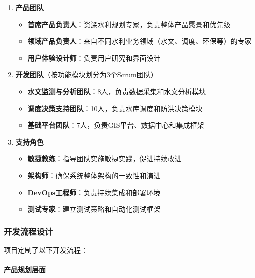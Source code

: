 \begin{enumerate}
\def\labelenumi{\arabic{enumi}.}
\tightlist
\item
  \textbf{产品团队}

  \begin{itemize}
  \tightlist
  \item
    \textbf{首席产品负责人}：资深水利规划专家，负责整体产品愿景和优先级
  \item
    \textbf{领域产品负责人}：来自不同水利业务领域（水文、调度、环保等）的专家
  \item
    \textbf{用户体验设计师}：负责用户研究和界面设计
  \end{itemize}
\item
  \textbf{开发团队}（按功能模块划分为3个Scrum团队）

  \begin{itemize}
  \tightlist
  \item
    \textbf{水文监测与分析团队}：8人，负责数据采集和水文分析模块
  \item
    \textbf{调度决策支持团队}：10人，负责水库调度和防洪决策模块
  \item
    \textbf{基础平台团队}：7人，负责GIS平台、数据中心和集成框架
  \end{itemize}
\item
  \textbf{支持角色}

  \begin{itemize}
  \tightlist
  \item
    \textbf{敏捷教练}：指导团队实施敏捷实践，促进持续改进
  \item
    \textbf{架构师}：确保系统整体架构的一致性和演进
  \item
    \textbf{DevOps工程师}：负责持续集成和部署环境
  \item
    \textbf{测试专家}：建立测试策略和自动化测试框架
  \end{itemize}
\end{enumerate}

\subsubsection{开发流程设计}\label{ux5f00ux53d1ux6d41ux7a0bux8bbeux8ba1}

项目定制了以下开发流程：

\paragraph{产品规划层面}\label{ux4ea7ux54c1ux89c4ux5212ux5c42ux9762}

